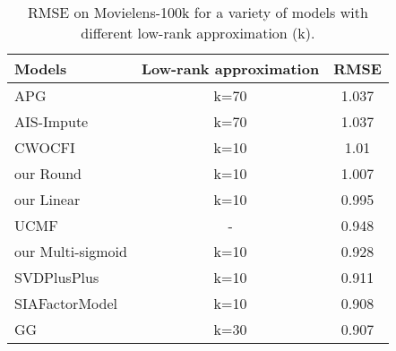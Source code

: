 \documentclass{article}
\begin{document}
\begin{table*}[tb]
	\centering
	\caption{RMSE on Movielens-100k for a variety of models with different low-rank approximation (k).}
	\label{tab:Ml}
\begin{tabular}{lcc}
\toprule
Models&Low-rank approximation&RMSE\\ \hline
APG~\citep{kwok2015accelerated}& k=70 & 1.037\\
AIS-Impute~\citep{kwok2015accelerated}& k=70 & 1.037\\
CWOCFI~\citep{lu2013second}& k=10 & 1.01\\
our Round& k=10 & 1.007\\
our Linear& k=10 & 0.995\\
UCMF~\citep{zhang2014information}& - & 0.948\\
our Multi-sigmoid& k=10 & 0.928\\
SVDPlusPlus~\citep{gantner2011mymedialite}& k=10 & 0.911\\
SIAFactorModel~\citep{gantner2011mymedialite}& k=10 & 0.908\\
GG~\citep{lakshminarayanan2011robust}& k=30 & 0.907\\
\bottomrule
\end{tabular}
\end{table*}



\end{document}
